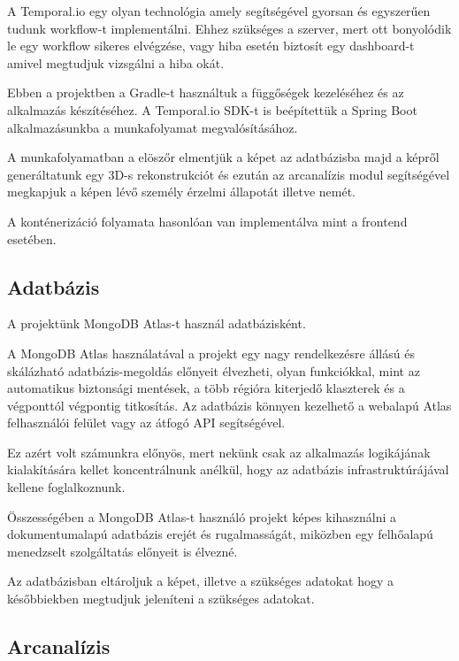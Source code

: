 \documentclass[12pt,a4]{article}
\begin{document}
            A Temporal.io egy olyan technológia amely segítségével gyorsan és
        	egyszerűen tudunk workflow-t implementálni. Ehhez szükséges a szerver,
        	mert ott bonyolódik le egy workflow sikeres elvégzése, vagy hiba esetén
        	biztosít egy dashboard-t amivel megtudjuk vizsgálni a hiba okát. 

            Ebben a projektben a Gradle-t használtuk a függőségek kezeléséhez és az alkalmazás készítéséhez. A Temporal.io SDK-t is beépítettük a Spring Boot alkalmazásunkba a munkafolyamat megvalósításához.

            A munkafolyamatban a elöszőr elmentjük a képet az adatbázisba majd a képről generáltatunk egy 3D-s rekonstrukciót és ezután az arcanalízis modul segítségével megkapjuk a képen lévő személy érzelmi állapotát illetve nemét.

            A konténerizáció folyamata hasonlóan van implementálva mint a frontend esetében.
         
        \subsection{Adatbázis}
            A projektünk MongoDB Atlas-t használ adatbázisként.

            A MongoDB Atlas használatával a projekt egy nagy rendelkezésre állású és skálázható adatbázis-megoldás előnyeit élvezheti, olyan funkciókkal, mint az automatikus biztonsági mentések, a több régióra kiterjedő klaszterek és a végponttól végpontig titkosítás. Az adatbázis könnyen kezelhető a webalapú Atlas felhasználói felület vagy az átfogó API segítségével. 
            
            Ez azért volt számunkra előnyös, mert nekünk csak az alkalmazás logikájának kialakítására kellet koncentrálnunk anélkül, hogy az adatbázis infrastruktúrájával kellene foglalkoznunk.

            Összességében a MongoDB Atlas-t használó projekt képes kihasználni a dokumentumalapú adatbázis erejét és rugalmasságát, miközben egy felhőalapú menedzselt szolgáltatás előnyeit is élvezné.

            Az adatbázisban eltároljuk a képet, illetve a szükséges adatokat hogy a későbbiekben megtudjuk jeleníteni a szükséges adatokat.
            
        \subsection{Arcanalízis}
\end{document}
